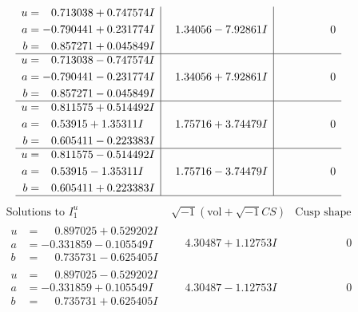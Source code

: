 \documentclass[1p]{elsarticle_modified}
\theoremstyle{definition}
\newcommand{\I}{\sqrt{-1}}
\begin{document}
$$\begin{array}{c|c|c}
\begin{aligned}
u &= \phantom{-}0.713038 + 0.747574 I \\
a &= -0.790441 + 0.231774 I \\
b &= \phantom{-}0.857271 + 0.045849 I\end{aligned}
 & \phantom{-}1.34056 - 7.92861 I & \phantom{-0.000000 } 0 \\ \hline\begin{aligned}
u &= \phantom{-}0.713038 - 0.747574 I \\
a &= -0.790441 - 0.231774 I \\
b &= \phantom{-}0.857271 - 0.045849 I\end{aligned}
 & \phantom{-}1.34056 + 7.92861 I & \phantom{-0.000000 } 0 \\ \hline\begin{aligned}
u &= \phantom{-}0.811575 + 0.514492 I \\
a &= \phantom{-}0.53915 + 1.35311 I \\
b &= \phantom{-}0.605411 - 0.223383 I\end{aligned}
 & \phantom{-}1.75716 + 3.74479 I & \phantom{-0.000000 } 0 \\ \hline\begin{aligned}
u &= \phantom{-}0.811575 - 0.514492 I \\
a &= \phantom{-}0.53915 - 1.35311 I \\
b &= \phantom{-}0.605411 + 0.223383 I\end{aligned}
 & \phantom{-}1.75716 - 3.74479 I & \phantom{-0.000000 } 0\\
 \hline 
 \end{array}$$\newpage$$\begin{array}{c|c|c}  
\text{Solutions to }I^u_{1}& \I (\text{vol} + \sqrt{-1}CS) & \text{Cusp shape}\\
 \hline 
\begin{aligned}
u &= \phantom{-}0.897025 + 0.529202 I \\
a &= -0.331859 - 0.105549 I \\
b &= \phantom{-}0.735731 - 0.625405 I\end{aligned}
 & \phantom{-}4.30487 + 1.12753 I & \phantom{-0.000000 } 0 \\ \hline\begin{aligned}
u &= \phantom{-}0.897025 - 0.529202 I \\
a &= -0.331859 + 0.105549 I \\
b &= \phantom{-}0.735731 + 0.625405 I\end{aligned}
 & \phantom{-}4.30487 - 1.12753 I & \phantom{-0.000000 } 0 \\ \hline\begin{aligned}

\end{aligned}
\end{array}$$
\end{document}
